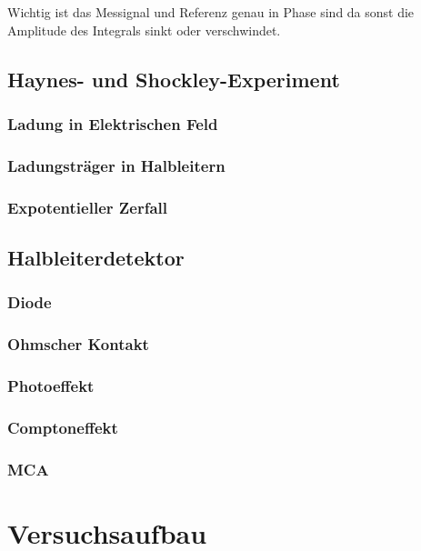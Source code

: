 \documentclass[12pt]{article}
\begin{document}
Wichtig ist das Messignal und Referenz genau in Phase sind da sonst die Amplitude des Integrals sinkt oder verschwindet.

\subsection{Haynes- und Shockley-Experiment}

\subsubsection{Ladung in Elektrischen Feld}

\subsubsection{Ladungsträger in Halbleitern}

\subsubsection{Expotentieller Zerfall}

\subsection{Halbleiterdetektor}

\subsubsection{Diode}

\subsubsection{Ohmscher Kontakt}

\subsubsection{Photoeffekt}

\subsubsection{Comptoneffekt}

\subsubsection{MCA}

\section{Versuchsaufbau}
\end{document}
